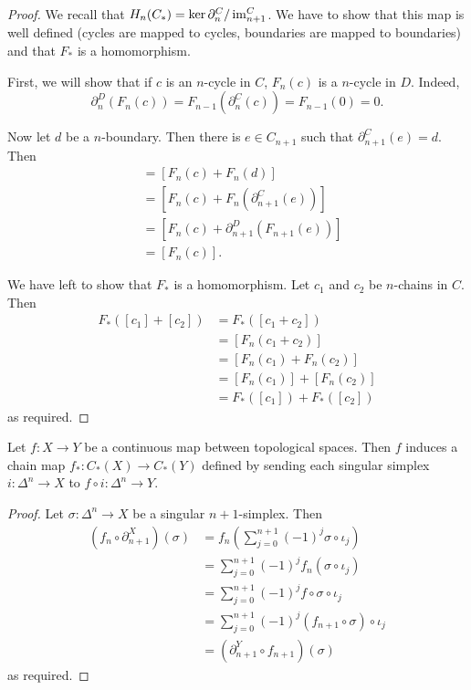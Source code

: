 \begin{proof}
	We recall that $H_n(C_*) = \ker \partial_n^C/\operatorname{im}_{n+1}^C$. We have to show that this map is well defined (cycles are mapped to cycles, boundaries are mapped to boundaries) and that $F_*$ is a homomorphism.

	First, we will show that if $c$ is an $n$-cycle in $C$, $F_n(c)$ is a $n$-cycle in $D$. Indeed,
	\[\partial^D_n(F_{n}(c))=F_{n-1}(\partial^C_n(c))=F_{n-1}(0)=0.\]

	Now let $d$ be a $n$-boundary. Then there is $e \in C_{n+1}$ such that $\partial_{n+1}^C(e) = d$. Then
	\begin{align*}
		[F_n(c+d)] & =[F_n(c)+F_n(d)]                       \\
		           & =[F_n(c)+F_n(\partial_{n+1}^C(e))]     \\
		           & =[F_n(c)+\partial_{n+1}^D(F_{n+1}(e))] \\
		           & = [F_n(c)].
	\end{align*}

	We have left to show that $F_*$ is a homomorphism. Let $c_1$ and $c_2$ be $n$-chains in $C$. Then
	\begin{align*}
		F_*([c_1] + [c_2])
		 & = F_*([c_1 + c_2])        \\
		 & = [F_n(c_1 + c_2)]        \\
		 & = [F_n(c_1) + F_n(c_2)]   \\
		 & = [F_n(c_1)] +[F_n(c_2)]  \\
		 & = F_*([c_1]) + F_*([c_2])
	\end{align*}
	as required.
\end{proof}

\begin{proposition}
	Let $f: X \to Y$ be a continuous map between topological spaces. Then $f$ induces a chain map $f_*: C_*(X) \to C_*(Y)$ defined by sending each singular simplex $i: \Delta^n \to X$ to $f \circ i: \Delta^n \to Y$.
\end{proposition}

\begin{proof}
	Let $\sigma: \Delta^n \to X$ be a singular $n+1$-simplex. Then
	\begin{align*}
		(f_n \circ \partial_{n+1}^X)(\sigma)
		 & = f_n\left(
		\sum_{j=0}^{n+1} (-1)^j \sigma \circ \iota_j
		\right)                                                           \\
		 & = \sum_{j=0}^{n+1} (-1)^j f_n(\sigma \circ \iota_j)            \\
		 & = \sum_{j=0}^{n+1} (-1)^j f \circ \sigma \circ \iota_j         \\
		 & = \sum_{j=0}^{n+1} (-1)^j (f_{n+1} \circ \sigma) \circ \iota_j \\
		 & = (\partial_{n+1}^Y \circ f_{n+1})(\sigma)
	\end{align*}
	as required.
\end{proof}

